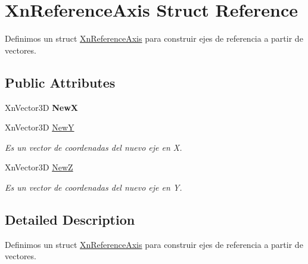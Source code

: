 \hypertarget{struct_xn_reference_axis}{\section{Xn\-Reference\-Axis Struct Reference}
\label{struct_xn_reference_axis}
}


Definimos un struct \hyperlink{struct_xn_reference_axis}{Xn\-Reference\-Axis} para construir ejes de referencia a partir de vectores.  


\subsection*{Public Attributes}
\begin{DoxyCompactItemize}
\item 
\hypertarget{struct_xn_reference_axis_a4ac206c12a05a55ca3b556525f53c072}{Xn\-Vector3\-D {\bfseries New\-X}}\label{struct_xn_reference_axis_a4ac206c12a05a55ca3b556525f53c072}

\item 
\hypertarget{struct_xn_reference_axis_abe619023a45ec8a7c827f9e42aedf070}{Xn\-Vector3\-D \hyperlink{struct_xn_reference_axis_abe619023a45ec8a7c827f9e42aedf070}{New\-Y}}\label{struct_xn_reference_axis_abe619023a45ec8a7c827f9e42aedf070}

\begin{DoxyCompactList}\small\item\em Es un vector de coordenadas del nuevo eje en X. \end{DoxyCompactList}\item 
\hypertarget{struct_xn_reference_axis_a149a25a6e03ea545d2e99b03a825da51}{Xn\-Vector3\-D \hyperlink{struct_xn_reference_axis_a149a25a6e03ea545d2e99b03a825da51}{New\-Z}}\label{struct_xn_reference_axis_a149a25a6e03ea545d2e99b03a825da51}

\begin{DoxyCompactList}\small\item\em Es un vector de coordenadas del nuevo eje en Y. \end{DoxyCompactList}\end{DoxyCompactItemize}


\subsection{Detailed Description}
Definimos un struct \hyperlink{struct_xn_reference_axis}{Xn\-Reference\-Axis} para construir ejes de referencia a partir de vectores. 

